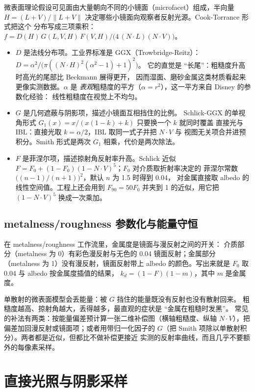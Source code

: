 \documentclass[12pt,a4paper,fontset=fandol]{ctexbook}
\begin{document}
微表面理论假设可见面由大量朝向不同的小镜面（microfacet）组成，半向量
\(H=(L+V)/\|L+V\|\) 决定哪些小镜面向观察者反射光源。Cook-Torrance 形式把这个
分布写成三项乘积：
\(f = D(H)\,G(L,V,H)\,F(V,H) / \bigl(4\,(N\!\cdot\!L)(N\!\cdot\!V)\bigr)\)。

\begin{itemize}
\item \(D\) 是法线分布项。工业界标准是 GGX（Trowbridge-Reitz）：
\(D = \alpha^{2} / \bigl(\pi ((N\!\cdot\!H)^{2}(\alpha^{2}-1)+1)^{2}\bigr)\)。
它的直觉是 ``长尾''：粗糙度升高时高光的尾部比 Beckmann 展得更开，
因而湿面、磨砂金属这类材质看起来更像实测数据。\(\alpha\) 是
\emph{表观}粗糙度的平方（\(\alpha = r^{2}\)），这一平方来自 Disney 的参数化经验：
线性粗糙度在视觉上不均匀。
\item \(G\) 是几何遮蔽与阴影项，描述小镜面互相挡住的比例。
Schlick-GGX 的单视角形式 \(G_{1}(x)=x/(x(1-k)+k)\) 只要换一个 \(k\) 就同时覆盖
直接光与 IBL：直接光取 \(k=\alpha/2\)，IBL 取同一式子并把 \(N\!\cdot\!V\) 与
视图无关项合并进预积分。Smith 形式是两次 \(G_{1}\) 相乘，代价是两次除法。
\item \(F\) 是菲涅尔项，描述掠射角反射率升高。Schlick 近似
\(F=F_{0}+(1-F_{0})(1-N\!\cdot\!V)^{5}\)；\(F_{0}\) 对介质取折射率决定的
菲涅尔常数 \(\bigl((n-1)/(n+1)\bigr)^{2}\)，默认 \(n\) 为 1.5 时得到 0.04，
对金属直接取 albedo 的线性空间值。工程上还会用到 \(F_{90}=50F_{0}\) 并夹到 1
的近似，用它把 \((1-N\!\cdot\!V)^{5}\) 换成一次乘加。
\end{itemize}

\subsection{metalness/roughness 参数化与能量守恒}

在 metalness/roughness 工作流里，金属度是镜面与漫反射之间的开关：
介质部分（metalness 为 0）有彩色漫反射与无色的 0.04 镜面反射；金属部分
（metalness 为 1）没有漫反射，镜面反射带上 albedo 的颜色。写出来就是
\(F_{0}\) 取 0.04 与 albedo 按金属度插值的结果，
\(k_{d} = (1-F)(1-m)\)，其中 \(m\) 是金属度。

单散射的微表面模型会丢能量：被 \(G\) 挡住的能量既没有反射也没有散射回来。
粗糙度越高、掠射角越大，丢得越多，最直观的症状是 ``金属在粗糙时发黑''。
常见的补法有两类：按能量偏差预计算一张二维补偿图（横轴粗糙度、纵轴
\(N\!\cdot\!V\)），把偏差加回漫反射或镜面项；或者用带归一化因子的
\(G\)（把 Smith 项除以单散射积分）。两者都是近似，但都比不做补偿更接近
实测的反射率曲线，而且几乎不要额外的每像素采样。

\section{直接光照与阴影采样}
\end{document}
